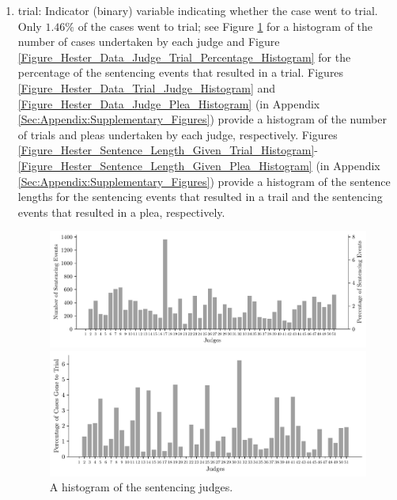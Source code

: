 \documentclass[11pt, oneside]{article}   	%
\theoremstyle{ModifiedStyle}
\begin{document}
\begin{enumerate}
		\item trial: Indicator (binary) variable indicating whether the case went to trial. Only $1.46\%$ of the cases went to trial; see Figure \ref{Figure_Hester_Data_Judge_Histogram} for a histogram of the number of cases undertaken by each judge and Figure \ref{Figure_Hester_Data_Judge_Trial_Percentage_Histogram} for the percentage of the sentencing events that resulted in a trial. Figures \ref{Figure_Hester_Data_Trial_Judge_Histogram} and \ref{Figure_Hester_Data_Judge_Plea_Histogram} (in Appendix \ref{Sec:Appendix:Supplementary_Figures}) provide a histogram of the number of trials and pleas undertaken by each judge, respectively. Figures \ref{Figure_Hester_Sentence_Length_Given_Trial_Histogram}-\ref{Figure_Hester_Sentence_Length_Given_Plea_Histogram} (in Appendix \ref{Sec:Appendix:Supplementary_Figures}) provide a histogram of the sentence lengths for the sentencing events that resulted in a trail and the sentencing events that resulted in a plea, respectively.
		\begin{figure}[H]
			\centering
			\vspace{-2mm}
			\begin{minipage}{\textwidth}
				\vspace{-0mm}
				\centering
				\includegraphics[scale=0.75]{Figures/Judge_Histogram}
				\vspace{-4mm}
				\caption{A histogram of the sentencing judges.}
				\label{Figure_Hester_Data_Judge_Histogram}
			\end{minipage}
			\begin{minipage}{\textwidth}
				\vspace{-0.5mm}
				\centering
				\includegraphics[scale=0.75]{Figures/Judge_Trial_Percentage_Histogram}

\end{minipage}
\end{figure}
\end{enumerate}
\end{document}
